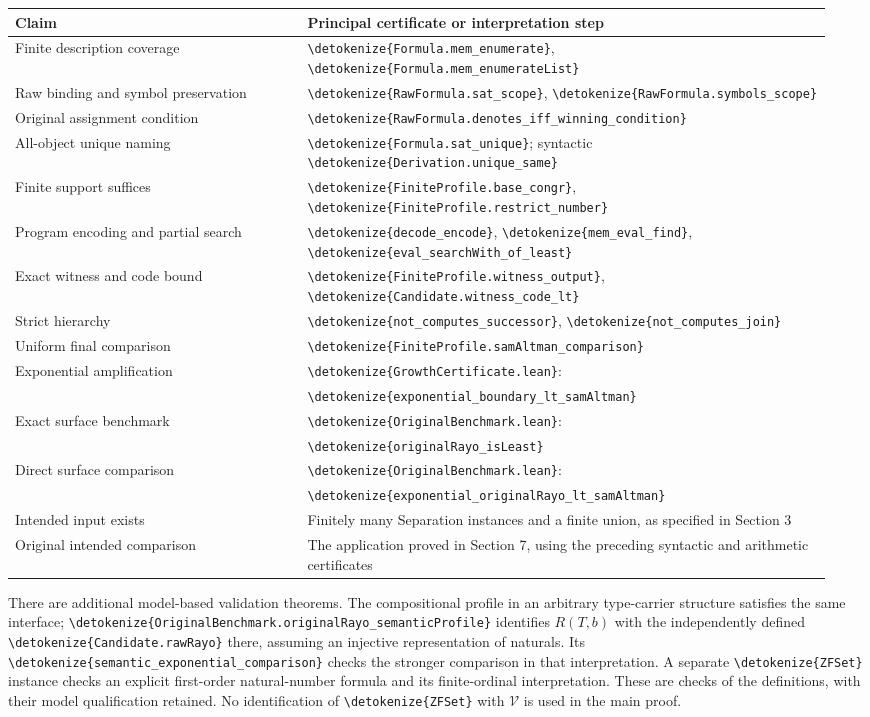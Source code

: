 \documentclass[11pt]{article}
\newcommand{\V}{\mathcal V}
\newcommand{\code}[1]{{\small\expandafter\nolinkurl\expandafter{\detokenize{#1}}}}
\begin{document}
\begin{center}
\small
\begin{tabular}{@{}>{\raggedright\arraybackslash}p{0.34\linewidth}>{\raggedright\arraybackslash}p{0.61\linewidth}@{}}
\toprule
Claim & Principal certificate or interpretation step\\
\midrule
Finite description coverage & \code{Formula.mem_enumerate},
  \code{Formula.mem_enumerateList}\\
Raw binding and symbol preservation & \code{RawFormula.sat_scope},
  \code{RawFormula.symbols_scope}\\
Original assignment condition & \code{RawFormula.denotes_iff_winning_condition}\\
All-object unique naming & \code{Formula.sat_unique}; syntactic
  \code{Derivation.unique_same}\\
Finite support suffices & \code{FiniteProfile.base_congr},
  \code{FiniteProfile.restrict_number}\\
Program encoding and partial search & \code{decode_encode},
  \code{mem_eval_find}, \code{eval_searchWith_of_least}\\
Exact witness and code bound & \code{FiniteProfile.witness_output},
  \code{Candidate.witness_code_lt}\\
Strict hierarchy & \code{not_computes_successor}, \code{not_computes_join}\\
Uniform final comparison & \code{FiniteProfile.samAltman_comparison}\\
Exponential amplification & \code{GrowthCertificate.lean}:\\[-2pt]
 & \code{exponential_boundary_lt_samAltman}\\
Exact surface benchmark & \code{OriginalBenchmark.lean}:\\[-2pt]
 & \code{originalRayo_isLeast}\\
Direct surface comparison & \code{OriginalBenchmark.lean}:\\[-2pt]
 & \code{exponential_originalRayo_lt_samAltman}\\
Intended input exists & Finitely many Separation instances and a finite union,
  as specified in Section 3\\
Original intended comparison & The application proved in Section 7, using
  the preceding syntactic and arithmetic certificates\\
\bottomrule
\end{tabular}
\end{center}

There are additional model-based validation theorems. The compositional
profile in an arbitrary type-carrier structure satisfies the same interface;
\code{OriginalBenchmark.originalRayo_semanticProfile} identifies $R(T,b)$
with the independently defined \code{Candidate.rawRayo} there, assuming an
injective representation of naturals. Its
\code{semantic_exponential_comparison} checks the stronger comparison in
that interpretation. A separate
\code{ZFSet} instance checks an explicit first-order natural-number formula
and its finite-ordinal interpretation. These are checks of the definitions,
with their model qualification retained. No identification of \code{ZFSet}
with $\V$ is used in the main proof.
\end{document}
